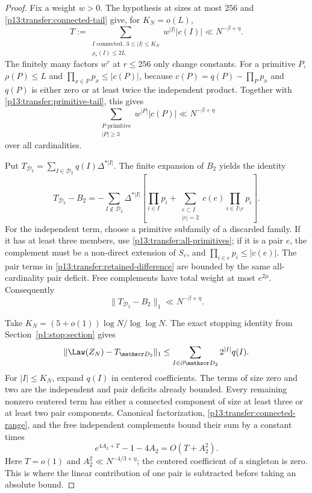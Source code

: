 \begin{proof}
Fix a weight $w>0$. The hypothesis at sizes at most $256$ and
\eqref{p13:transfer:connected-tail} give, for $K_N=o(L)$,
\begin{equation}
 T:=\sum_{\substack{I\text{ connected},\ 3\leq|I|\leq K_N\\
                             \rho_*(I)\leq2L}}
                  w^{|I|}|c(I)|\ll N^{-\beta+\eta}.
 \label{p13:transfer:connected-range}
\end{equation}
The finitely many factors $w^r$ at $r\leq256$ only change constants.
For a primitive $P$, $\rho(P)\leq L$ and
$\prod_{x\in P}p_x\leq|c(P)|$, because
$c(P)=q(P)-\prod_Pp_x$ and $q(P)$ is either zero or at least twice
the independent product. Together with
\eqref{p13:transfer:primitive-tail}, this gives
\begin{equation}
 \sum_{\substack{P\text{ primitive}\\|P|\geq3}}
                     w^{|P|}|c(P)|\ll N^{-\beta+\eta}
 \label{p13:transfer:all-primitives}
\end{equation}
over all cardinalities.

Put $T_{\mathscr D_2}=\sum_{I\in\mathscr D_2}q(I)\Delta^{*|I|}$.
The finite expansion of $B_2$ yields the identity
\begin{equation}
 T_{\mathscr D_2}-B_2
 =-\sum_{I\notin\mathscr D_2}\Delta^{*|I|}
       \left[\prod_{i\in I}p_i+
          \sum_{\substack{e\subset I\\|e|=2}}
                   c(e)\prod_{i\in I\setminus e}p_i\right].
 \label{p13:transfer:retained-difference}
\end{equation}
For the independent term, choose a primitive subfamily of a discarded
family. If it has at least three members, use
\eqref{p13:transfer:all-primitives}; if it is a pair $e$, the complement
must be a non-direct extension of $S_e$, and
$\prod_{i\in e}p_i\leq|c(e)|$.
The pair terms in \eqref{p13:transfer:retained-difference} are bounded
by the same all-cardinality pair deficit. Free complements have total
weight at most $e^{2\mu}$. Consequently
\begin{equation}
 \|T_{\mathscr D_2}-B_2\|_1\ll N^{-\beta+\eta}.
 \label{p13:transfer:retained-error}
\end{equation}

Take $K_N=(5+o(1))\log N/\log\log N$.
The exact stopping identity from Section~\ref{p1:stop:section} gives
\[
 \|\Law(Z_N)-T_{\mathscr D_2}\|_1
       \leq\sum_{I\in\partial\mathscr D_2}2^{|I|}q(I).
\]
For $|I|\leq K_N$, expand $q(I)$ in centered coefficients. The terms
of size zero and two are the independent and pair deficits already
bounded. Every remaining nonzero centered term has either a connected
component of size at least three or at least two pair components.
Canonical factorization, \eqref{p13:transfer:connected-range}, and
the free independent complements bound their sum by a constant times
\[
 e^{4A_2+T}-1-4A_2=O(T+A_2^2).
\]
Here $T=o(1)$ and $A_2^2\ll N^{-4/3+\eta}$; the centered coefficient
of a singleton is zero. This is where the linear contribution of one
pair is subtracted before taking an absolute bound.


\end{proof}
